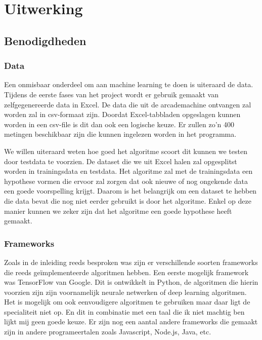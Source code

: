 
\chapter{Uitwerking}
\label{ch:uitwerking}


\section{Benodigdheden}
\label{sec:Benodigdheden}

\subsection{Data}
Een onmisbaar onderdeel om aan machine learning te doen is uiteraard de data. Tijdens de eerste fases van het project wordt er gebruik gemaakt van zelfgegenereerde data in Excel. De data die uit de arcademachine ontvangen zal worden zal in csv-formaat zijn. Doordat Excel-tabbladen opgeslagen kunnen worden in een csv-file is dit dan ook een logische keuze. 
Er zullen zo'n 400 metingen beschikbaar zijn die kunnen ingelezen worden in het programma. 

We willen uiteraard weten hoe goed het algoritme scoort dit kunnen we testen door testdata te voorzien. De dataset die we uit Excel halen zal opgesplitst worden in trainingsdata en testdata. Het algoritme zal met de trainingsdata een hypothese vormen die ervoor zal zorgen dat ook nieuwe of nog ongekende data een goede voorspelling krijgt. Daarom is het belangrijk om een dataset te hebben die data bevat die nog niet eerder gebruikt is door het algoritme. Enkel op deze manier kunnen we zeker zijn dat het algoritme een goede hypothese heeft gemaakt. 

\subsection{Frameworks}
Zoals in de inleiding reeds besproken was zijn er verschillende soorten frameworks die reeds geïmplementeerde algoritmen hebben. Een eerste mogelijk framework was TensorFlow van Google. Dit is ontwikkelt in Python, de algoritmen die hierin voorzien zijn zijn voornamelijk neurale netwerken of deep learning algoritmen. Het is mogelijk om ook eenvoudigere algoritmen te gebruiken maar daar ligt de specialiteit niet op. En dit in combinatie met een taal die ik niet machtig ben lijkt mij geen goede keuze. Er zijn nog een aantal andere frameworks die gemaakt zijn in andere programeertalen zoals Javascript, Node.js, Java, etc. 

